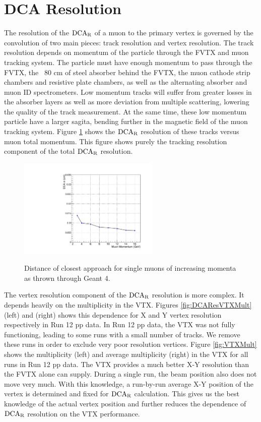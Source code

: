 \documentclass[12pt]{article}
\newcommand{\dcar}{$\rm{DCA}_{R}$ }
\begin{document}
\section{DCA Resolution}
\label{sec:DCA}

The resolution of the \dcar of a muon to the primary vertex is governed by the convolution of two main pieces: track resolution and vertex resolution.
The track resolution depends on momentum of the particle through the FVTX and muon tracking system.  The particle must have enough momentum to pass through 
the FVTX, the ~80 cm of steel absorber behind the FVTX, the muon cathode strip chambers and resistive plate chambers, as well as the alternating absorber and muon ID
spectrometers.  Low momentum tracks will suffer from greater losses in the absorber layers as well as more deviation from multiple scattering, lowering the quality of the track
measurement.  At the same time, these low momentum particle have a larger sagita, bending further in the magnetic field of the muon tracking system.  Figure \ref{fig:MuonTrackDCA}
shows the \dcar resolution of these tracks versus muon total momentum. This figure shows purely the tracking resolution component of the total \dcar resolution.

\begin{figure}[h]
\begin{center}
\includegraphics[width=0.6\textwidth,angle=0]{figures/SingleMuon_SigmaVMomentum}
\\ \caption{Distance of closest approach for single muons of increasing momenta as thrown through Geant 4.}
\label{fig:MuonTrackDCA}
\end{center}
\end{figure}

The vertex resolution component of the \dcar resolution is more complex.  It depends heavily on the multiplicity in the VTX.
Figures \ref{fig:DCAResVTXMult} (left) and (right) shows this dependence for X and Y vertex resolution respectively in Run 12 pp data.
In Run 12 pp data, the VTX was not fully functioning, leading to some runs with a small number of tracks.  We remove these runs in order to 
exclude very poor resolution vertices.  Figure \ref{fig:VTXMult} shows the multiplicity (left) and average multiplicity (right) in the VTX for all runs in Run 12 pp data.
The VTX provides a much better X-Y resolution than the FVTX alone can supply.  During a single run, the beam position also does not move very much.
With this knowledge, a run-by-run average X-Y position of the vertex is determined and fixed for \dcar calculation.  This gives us the best knowledge of the 
actual vertex position and further reduces the dependence of \dcar resolution on the VTX performance.
\end{document}
